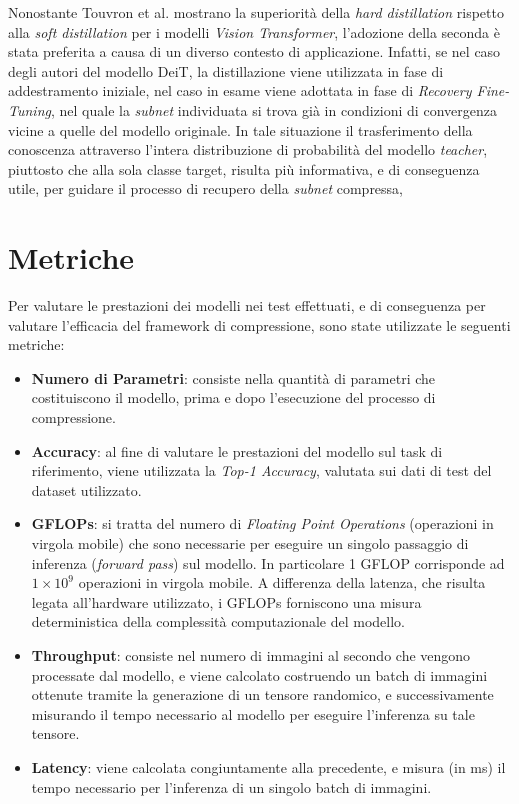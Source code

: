 Nonostante Touvron et al.
\cite{touvron2021trainingdataefficientimagetransformers} mostrano la
superiorità della \textit{hard distillation} rispetto alla \textit{soft
    distillation} per i modelli \textit{Vision Transformer}, l'adozione della
seconda è stata preferita a causa di un diverso contesto di applicazione.
Infatti, se nel caso degli autori del modello DeiT, la distillazione viene
utilizzata in fase di addestramento iniziale, nel caso in esame viene adottata
in fase di \textit{Recovery Fine-Tuning}, nel quale la \textit{subnet}
individuata si trova già in condizioni di convergenza vicine a quelle del
modello originale. In tale situazione il trasferimento della conoscenza
attraverso l'intera distribuzione di probabilità del modello \textit{teacher},
piuttosto che alla sola classe target, risulta più informativa, e di conseguenza
utile, per guidare il processo di recupero della \textit{subnet} compressa,

\section{Metriche}
Per valutare le prestazioni dei modelli nei test effettuati, e di conseguenza
per valutare l'efficacia del framework di compressione, sono state utilizzate
le seguenti metriche:
\begin{itemize}
    \item \textbf{Numero di Parametri}: consiste nella quantità di parametri che costituiscono il modello, prima e dopo l'esecuzione del processo di compressione.
    \item \textbf{Accuracy}: al fine di valutare le prestazioni del modello sul task di riferimento, viene utilizzata la \textit{Top-1 Accuracy}, valutata sui dati di test del dataset utilizzato.
    \item \textbf{GFLOPs}: si tratta del numero di \textit{Floating Point Operations} (operazioni in virgola mobile) che sono necessarie per eseguire un singolo passaggio di inferenza (\textit{forward pass}) sul modello. In particolare 1 GFLOP corrisponde ad $1 \times 10^9$ operazioni in virgola mobile. A differenza della latenza, che risulta legata all'hardware utilizzato, i GFLOPs forniscono una misura deterministica della complessità computazionale del modello.
    \item \textbf{Throughput}: consiste nel numero di immagini al secondo che vengono processate dal modello, e viene calcolato costruendo un batch di immagini ottenute tramite la generazione di un tensore randomico, e successivamente misurando il tempo necessario al modello per eseguire l'inferenza su tale tensore.
    \item \textbf{Latency}: viene calcolata congiuntamente alla precedente, e misura (in ms) il tempo necessario per l'inferenza di un singolo batch di immagini.
\end{itemize}

